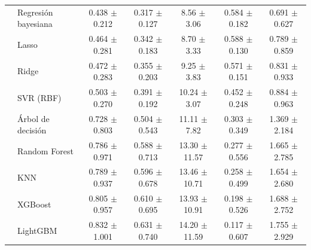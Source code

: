 \begin{longtable}{llccccc}
 & Regresión bayesiana & 0.438 $\pm$ 0.212 & 0.317 $\pm$ 0.127 & 8.56 $\pm$ 3.06 & 0.584 $\pm$ 0.182 & 0.691 $\pm$ 0.627 \\
 & Lasso & 0.464 $\pm$ 0.281 & 0.342 $\pm$ 0.183 & 8.70 $\pm$ 3.33 & 0.588 $\pm$ 0.130 & 0.789 $\pm$ 0.859 \\
 & Ridge & 0.472 $\pm$ 0.283 & 0.355 $\pm$ 0.203 & 9.25 $\pm$ 3.83 & 0.571 $\pm$ 0.151 & 0.831 $\pm$ 0.933 \\
 & SVR (RBF) & 0.503 $\pm$ 0.270 & 0.391 $\pm$ 0.192 & 10.24 $\pm$ 3.07 & 0.452 $\pm$ 0.248 & 0.884 $\pm$ 0.963 \\
 & Árbol de decisión & 0.728 $\pm$ 0.803 & 0.504 $\pm$ 0.543 & 11.11 $\pm$ 7.82 & 0.303 $\pm$ 0.349 & 1.369 $\pm$ 2.184 \\
 & Random Forest & 0.786 $\pm$ 0.971 & 0.588 $\pm$ 0.713 & 13.30 $\pm$ 11.57 & 0.277 $\pm$ 0.556 & 1.665 $\pm$ 2.785 \\
 & KNN & 0.789 $\pm$ 0.937 & 0.596 $\pm$ 0.678 & 13.46 $\pm$ 10.71 & 0.258 $\pm$ 0.499 & 1.654 $\pm$ 2.680 \\
 & XGBoost & 0.805 $\pm$ 0.957 & 0.610 $\pm$ 0.695 & 13.93 $\pm$ 10.91 & 0.198 $\pm$ 0.526 & 1.688 $\pm$ 2.752 \\
 & LightGBM & 0.832 $\pm$ 1.001 & 0.631 $\pm$ 0.740 & 14.20 $\pm$ 11.59 & 0.117 $\pm$ 0.607 & 1.755 $\pm$ 2.929 \\
\end{longtable}